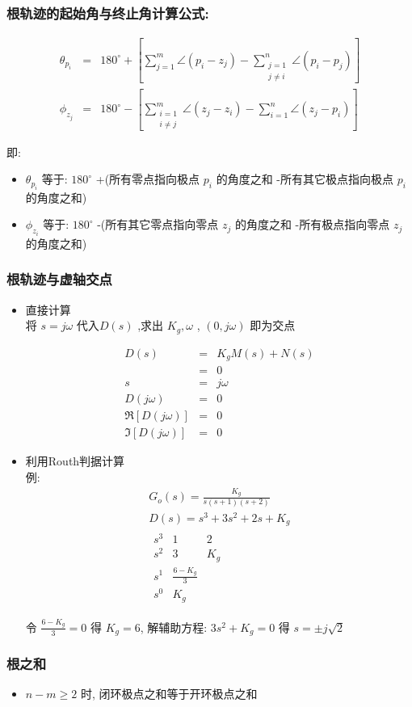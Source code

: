 \documentclass{article}
\begin{document}
\begin{frame}
\frametitle{根轨迹的起始角与终止角计算公式:}
\label{sec-2-1-8}

   
\begin{eqnarray*}
\theta_{p_i} & = & 180^{\circ}+\left[\sum_{j=1}^m\angle(p_i-z_j)-\sum_{\substack{j=1 \\ j\neq i}}^n\angle(p_i-p_j)\right] \\
\phi_{z_j} & = & 180^{\circ}-\left[\sum_{\substack{i=1 \\ i\neq j}}^m\angle(z_j-z_i)-\sum_{i=1}^n\angle(z_j-p_i)\right] 
\end{eqnarray*}

即:
\begin{itemize}
\item $\theta_{p_i}$  等于:  $180^{\circ}$  +(所有零点指向极点 $p_i$ 的角度之和 -所有其它极点指向极点 $p_i$ 的角度之和)
\item $\phi_{z_i}$ 等于: $180^{\circ}$ -(所有其它零点指向零点 $z_j$ 的角度之和 -所有极点指向零点 $z_j$ 的角度之和)
\end{itemize}
\end{frame}
\begin{frame}
\frametitle{根轨迹与虚轴交点}
\label{sec-2-1-9}
\begin{itemize}

\item 直接计算\\
\label{sec-2-1-9-1}%
将 $s=j\omega$ 代入$D(s)$ ,求出 $K_g,\omega$ , $(0,j\omega)$ 即为交点

\begin{eqnarray*}
D(s) &= &K_gM(s)+N(s) \\
 &=& 0 \\
s &=& j\omega \\
D(j\omega) &=& 0 \\
\Re[D(j\omega)] &=& 0\\
\Im[D(j\omega)] &=& 0
\end{eqnarray*}


\item 利用Routh判据计算\\
\label{sec-2-1-9-2}%
例:
\begin{gather*}
G_o(s)  =  \frac{K_g}{s(s+1)(s+2)} \\
D(s)  = s^3+3s^2+2s+K_g \\
\begin{matrix}
s^3  &  1 &  2 \\
s^2  &  3  &  K_g \\
s^1  & \frac{6-K_g}{3} \\
s^0  & K_g
\end{matrix}
\end{gather*}

令 $\frac{6-K_g}{3}=0$ 得 $K_g=6$, 解辅助方程: $3s^2+K_g=0$ 得 $s=\pm j\sqrt{2}$
\end{itemize} %
\end{frame}
\begin{frame}
\frametitle{根之和}
\label{sec-2-1-10}

\begin{itemize}
\item <2-> $n-m\geq 2$ 时, 闭环极点之和等于开环极点之和
\end{itemize}
\end{frame}
\end{document}
